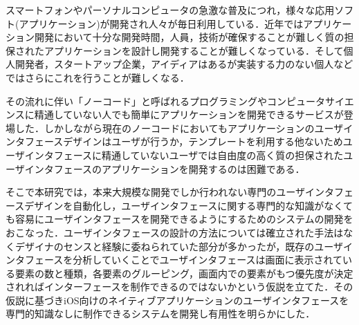 
\begin{jabstract}

スマートフォンやパーソナルコンピュータの急激な普及につれ，様々な応用ソフト(アプリケーション)が開発され人々が毎日利用している．近年ではアプリケーション開発において十分な開発時間，人員，技術が確保することが難しく質の担保されたアプリケーションを設計し開発することが難しくなっている．そして個人開発者，スタートアップ企業，アイディアはあるが実装する力のない個人などではさらにこれを行うことが難しくなる．

その流れに伴い「ノーコード」と呼ばれるプログラミングやコンピュータサイエンスに精通していない人でも簡単にアプリケーションを開発できるサービスが登場した．しかしながら現在のノーコードにおいてもアプリケーションのユーザインタフェースデザインはユーザが行うか，テンプレートを利用する他ないためユーザインタフェースに精通していないユーザでは自由度の高く質の担保されたユーザインタフェースのアプリケーションを開発するのは困難である．

そこで本研究では，本来大規模な開発でしか行われない専門のユーザインタフェースデザインを自動化し，ユーザインタフェースに関する専門的な知識がなくても容易にユーザインタフェースを開発できるようにするためのシステムの開発をおこなった．ユーザインタフェースの設計の方法については確立された手法はなくデザイナのセンスと経験に委ねられていた部分が多かったが，既存のユーザインタフェースを分析していくことでユーザインタフェースは画面に表示されている要素の数と種類，各要素のグルーピング，画面内での要素がもつ優先度が決定されればインターフェースを制作できるのではないかという仮説を立てた．その仮説に基づきiOS向けのネイティブアプリケーションのユーザインタフェースを専門的知識なしに制作できるシステムを開発し有用性を明らかにした．
\end{jabstract}


